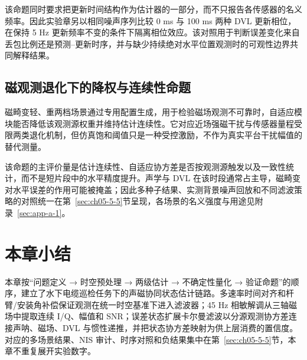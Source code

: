 该命题同时要求把更新时间结构作为估计器的一部分，而不只报告各传感器的名义频率。因此实验章另以相同噪声序列比较 0 ms 与 100 ms 两种 DVL 更新相位，在保持 5 Hz 更新频率不变的条件下隔离相位效应。该对照用于判断误差变化来自丢包比例还是预测--更新时序，并与缺少持续绝对水平位置观测时的可观性边界共同解释结果。

\subsection{磁观测退化下的降权与连续性命题}\label{sec:ch03-3-5-2}

磁畸变轻、重两档场景通过专用配置生成，用于检验磁场观测不可靠时，自适应模块能否降低该观测源权重并维持估计连续性。它对应近场强磁干扰与传感器量程受限两类退化机制，但仿真饱和阈值只是一种受控激励，不作为真实平台干扰幅值的替代测量。

该命题的主评价量是估计连续性、自适应协方差是否按观测源触发以及一致性统计，而不是短片段中的水平精度提升。声学与 DVL 在该时段通常占主导，磁畸变对水平误差的作用可能被掩盖；因此多种子结果、实测背景噪声回放和不同滤波策略的对照统一在第~\ref{sec:ch05-5-5}节呈现，各场景的名义强度与用途见附录~\ref{sec:app-a-1}。

\section{本章小结}\label{sec:ch03-3-6}

本章按``问题定义 → 时空预处理 → 两级估计 → 不确定性量化 → 验证命题''的顺序，建立了水下电缆巡检任务下的声磁协同状态估计链路。多速率时间对齐和杆臂/安装角补偿保证观测在统一时空基准下进入滤波器；45 Hz 相敏解调从三轴磁场中提取连续 I/Q、幅值和 SNR；误差状态扩展卡尔曼滤波以分源观测协方差连接声呐、磁场、DVL 与惯性递推，并把状态协方差映射为供上层消费的置信度。对应的多场景结果、NIS 审计、时序对照和负结果集中在第~\ref{sec:ch05-5-5}节，本章不重复展开实验数字。
